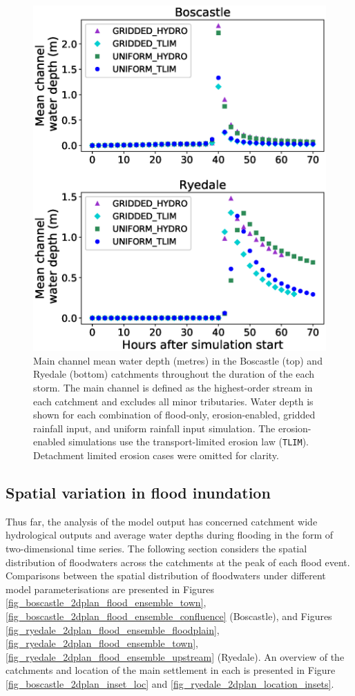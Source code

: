 \begin{figure}[!htbp]
\includegraphics[width=12cm]{chp_flood_figs_scripts/channel_mean_depth.eps}
\caption{Main channel mean water depth (metres) in the Boscastle (top) and Ryedale (bottom) catchments throughout the duration of the each storm. The main channel is defined as the highest-order stream in each catchment \citep{strahler1957quantitative} and excludes all minor tributaries. Water depth is shown for each combination of flood-only, erosion-enabled, gridded rainfall input, and uniform rainfall input simulation. The erosion-enabled simulations use the transport-limited erosion law (\texttt{TLIM}). Detachment limited erosion cases were omitted for clarity.}
\label{fig_channel_depth_ensemble}
\end{figure}


\subsection{Spatial variation in flood inundation}
Thus far, the analysis of the model output has concerned catchment wide hydrological outputs and average water depths during flooding in the form of two-dimensional time series. The following section considers the spatial distribution of floodwaters across the catchments at the peak of each flood event. Comparisons between the spatial distribution of floodwaters under different model parameterisations are presented in Figures \ref{fig_boscastle_2dplan_flood_ensemble_town}, \ref{fig_boscastle_2dplan_flood_ensemble_confluence} (Boscastle), and Figures \ref{fig_ryedale_2dplan_flood_ensemble_floodplain}, \ref{fig_ryedale_2dplan_flood_ensemble_town}, \ref{fig_ryedale_2dplan_flood_ensemble_upstream} (Ryedale). An overview of the catchments and location of the main settlement in each is presented in Figure \ref{fig_boscastle_2dplan_inset_loc} and \ref{fig_ryedale_2dplan_location_insets}.

